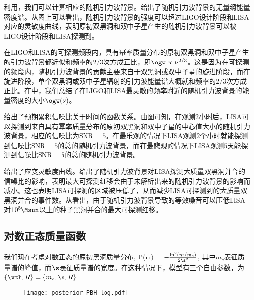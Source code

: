 利用，我们可以计算相应的随机引力波背景。给出了随机引力波背景的无量纲能量密度谱。从图上可以看出，随机引力波背景的强度可以超过LIGO设计阶段和LISA对应的灵敏度曲线，表明原初双黑洞和双中子星产生的随机引力波背景可以被LIGO设计阶段和LISA探测到。

在LIGO和LISA的可探测频段内，具有幂率质量分布的原初双黑洞和双中子星产生的引力波背景都近似和频率的$2/3$次方成正比，即$\ogw \propto \nu^{2/3}$。这是因为在可探测的频段内，随机引力波背景的贡献主要来自于双黑洞或双中子星的旋进阶段，而在旋进阶段，单个双黑洞或双中子星辐射的引力波能量谱大概就和频率的$2/3$次方成正比。在中，我们总结了在LIGO和LISA最灵敏的频率附近的随机引力波背景的能量密度的大小$\ogw (\nu)$。


给出了预期累积信噪比关于时间的函数关系。由图可知，在观测$2$小时后，LISA可以探测到来自具有幂率质量分布的原初双黑洞和双中子星的中心值大小的随机引力波背景，相应的信噪比为$\mathrm{SNR} = 5$。在最乐观的情况下LISA观测$2$个小时就能探测到信噪比$\mathrm{SNR} = 5$的总的随机引力波背景，而在最悲观的情况下LISA观测$5$天能探测到信噪比$\mathrm{SNR} = 5$的总的随机引力波背景。


给出了应变灵敏度曲线。给出了随机引力波背景对LISA探测大质量双黑洞并合的信噪比的影响，表明最大可探测红移会由于未解析出来的随机引力波背景的影响而减小。这也表明LISA可探测的区域被压低了，从而减少LISA可探测到的大质量双黑洞并合的事件数。从看出，由于随机引力波背景导致的等效噪音可以压低LISA对$10^5 \Msun$以上的种子黑洞并合的最大可探测红移。




\FloatBarrier
\subsection{对数正态质量函数}

我们现在考虑对数正态的原初黑洞质量分布\citep{Dolgov:1992pu},
\e\label{log}
P(m) =  
\exp\(-\frac{\ln^2(m/m_c)}{2 \s^2}\),
\q
其中$m_c$表征质量谱的峰值，而$\s$表征质量谱的宽度。在这种情况下，模型有三个自由参数，为$\{\vth, R\} = \{m_c, \s, R\}$.

\begin{figure}[htb!]
    \centering
    \texttt{[image: posterior-PBH-log.pdf]}
\end{figure}

